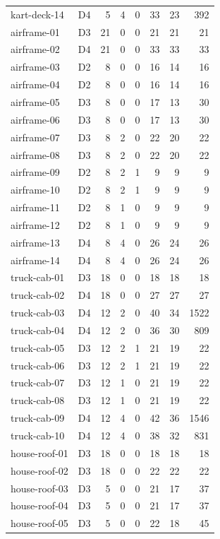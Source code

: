 \begin{longtable}{llrrrrrr}
kart-deck-14 & D4 & 5 & 4 & 0 & 33 & 23 & 392\\
airframe-01 & D3 & 21 & 0 & 0 & 21 & 21 & 21\\
airframe-02 & D4 & 21 & 0 & 0 & 33 & 33 & 33\\
airframe-03 & D2 & 8 & 0 & 0 & 16 & 14 & 16\\
airframe-04 & D2 & 8 & 0 & 0 & 16 & 14 & 16\\
airframe-05 & D3 & 8 & 0 & 0 & 17 & 13 & 30\\
airframe-06 & D3 & 8 & 0 & 0 & 17 & 13 & 30\\
airframe-07 & D3 & 8 & 2 & 0 & 22 & 20 & 22\\
airframe-08 & D3 & 8 & 2 & 0 & 22 & 20 & 22\\
airframe-09 & D2 & 8 & 2 & 1 & 9 & 9 & 9\\
airframe-10 & D2 & 8 & 2 & 1 & 9 & 9 & 9\\
airframe-11 & D2 & 8 & 1 & 0 & 9 & 9 & 9\\
airframe-12 & D2 & 8 & 1 & 0 & 9 & 9 & 9\\
airframe-13 & D4 & 8 & 4 & 0 & 26 & 24 & 26\\
airframe-14 & D4 & 8 & 4 & 0 & 26 & 24 & 26\\
truck-cab-01 & D3 & 18 & 0 & 0 & 18 & 18 & 18\\
truck-cab-02 & D4 & 18 & 0 & 0 & 27 & 27 & 27\\
truck-cab-03 & D4 & 12 & 2 & 0 & 40 & 34 & 1522\\
truck-cab-04 & D4 & 12 & 2 & 0 & 36 & 30 & 809\\
truck-cab-05 & D3 & 12 & 2 & 1 & 21 & 19 & 22\\
truck-cab-06 & D3 & 12 & 2 & 1 & 21 & 19 & 22\\
truck-cab-07 & D3 & 12 & 1 & 0 & 21 & 19 & 22\\
truck-cab-08 & D3 & 12 & 1 & 0 & 21 & 19 & 22\\
truck-cab-09 & D4 & 12 & 4 & 0 & 42 & 36 & 1546\\
truck-cab-10 & D4 & 12 & 4 & 0 & 38 & 32 & 831\\
house-roof-01 & D3 & 18 & 0 & 0 & 18 & 18 & 18\\
house-roof-02 & D3 & 18 & 0 & 0 & 22 & 22 & 22\\
house-roof-03 & D3 & 5 & 0 & 0 & 21 & 17 & 37\\
house-roof-04 & D3 & 5 & 0 & 0 & 21 & 17 & 37\\
house-roof-05 & D3 & 5 & 0 & 0 & 22 & 18 & 45\\

\end{longtable}
